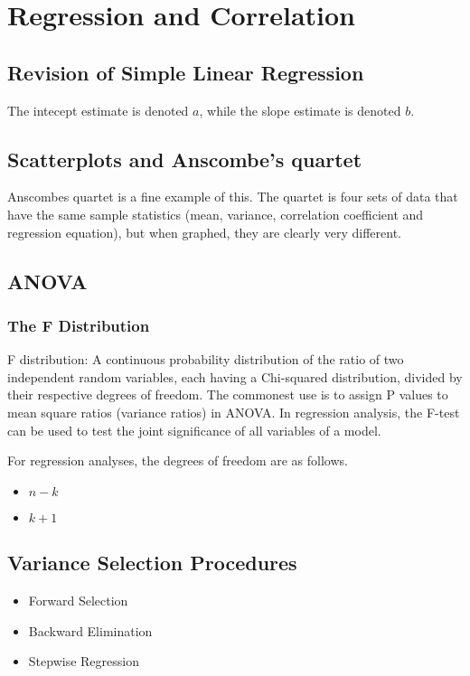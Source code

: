 \newpage
\chapter{Regression and Correlation}
\section{Revision of Simple Linear Regression}

The intecept estimate is denoted $a$, while the slope estimate is denoted $b$.


\section{Scatterplots and Anscombe's quartet}
Anscombes quartet is a fine example of this. The quartet is four sets of data that have the same sample statistics (mean, variance, correlation coefficient and regression equation), but when graphed, they are clearly very different.

\newpage

\newpage
\section{ANOVA}
\subsection{The F Distribution}
F distribution: A continuous probability distribution of the ratio of two independent random variables, each having a Chi-squared distribution, divided by their respective degrees of freedom. The commonest use is to assign P values to mean square ratios (variance ratios) in ANOVA. In regression analysis, the F-test can be used to test the joint significance of all variables of a model.


For regression analyses, the degrees of freedom are as follows.
\begin{itemize}
\item $n-k$
\item $k+1$
\end{itemize}

\newpage
\section{Variance Selection Procedures}
\begin{itemize}
\item Forward Selection
\item Backward Elimination
\item Stepwise Regression
\end{itemize}

